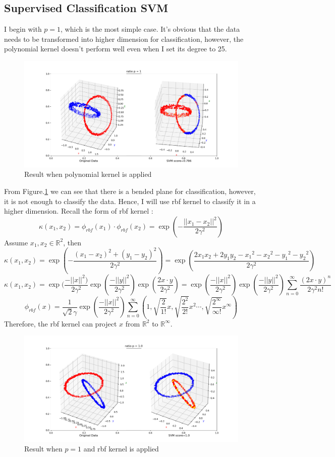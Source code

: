 \documentclass{article}
\begin{document}
\subsection{Supervised Classification SVM}
I begin with $p=1$, which is the most simple case. It's obvious that the data needs to be transformed into higher dimension for classification, however, the polynomial kernel doesn't perform well even when I set its degree to 25.
\begin{figure}[H]
    \centering
    \includegraphics[scale=0.5]{poly.png}
    \caption{Result when polynomial kernel is applied}
    \label{poly}
\end{figure}
From Figure.\ref{poly} we can see that there is a bended plane for classification, however, it is not enough to classify the data. Hence, I will use rbf kernel to classify it in a higher dimension. Recall the form of rbf kernel :
$$\kappa(x_1,x_2)=\phi_{rbf}(x_1)\cdot\phi_{rbf}(x_2)=\exp(-\frac{||x_1-x_2||^2}{2\gamma^2})$$
Assume $x_1,x_2\in\mathbb{R}^2$, then 
$$\kappa(x_1,x_2)=\exp(-\frac{(x_1-x_2)^2+(y_1-y_2)^2}{2\gamma^2})=\exp(\frac{2x_1x_2+2y_1y_2-{x_1}^2-{x_2}^2-{y_1}^2-{y_2}^2}{2\gamma^2})$$
$$\kappa(x_1,x_2)=\exp(\frac{-||x||^2)}{2\gamma^2}\exp(\frac{-||y||^2}{2\gamma^2})\exp(\frac{2x\cdot y}{2\gamma^2})=\exp(\frac{-||x||^2}{2\gamma^2})\exp(\frac{-||y||^2}{2\gamma^2})\sum_{n=0}^\infty \frac{(2x\cdot y)^n}{2\gamma^2n!}$$
$$\phi_{rbf}(x)=\frac{1}{\sqrt{2}\gamma}\exp(\frac{-||x||^2}{2\gamma^2})\sum_{n=0}^\infty(1,\sqrt{\frac{2}{1!}}x,\sqrt{\frac{2^2}{2!}}x^2\cdots,\sqrt{\frac{2^\infty}{\infty!}}x^\infty)$$
Therefore, the rbf kernel can project $x$ from $\mathbb{R}^2$ to $\mathbb{R}^\infty$.
\begin{figure}[H]
    \centering
    \includegraphics[scale=0.5]{svm.png}
    \caption{Result when $p=1$ and rbf kernel is applied}
    \label{rbf}
\end{figure}
\end{document}
